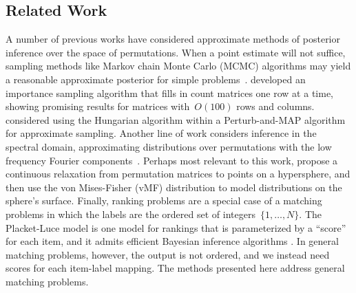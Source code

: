\documentclass[twoside]{article}
\begin{document}
\subsection{Related Work}
A number of previous works have considered approximate methods of
posterior inference over the space of permutations.  When a point
estimate will not suffice, sampling methods like Markov chain Monte
Carlo (MCMC) algorithms may yield a reasonable approximate posterior
for simple problems~\citep{diaconis1988group}.
\citet{harrison2013importance} developed an importance sampling
algorithm that fills in count matrices one row at a time, showing
promising results for matrices with~$O(100)$ rows and
columns. \citet{li2013efficient} considered using the Hungarian
algorithm within a Perturb-and-MAP algorithm for approximate sampling.
Another line of work considers inference in the spectral domain,
approximating distributions over permutations with the low frequency
Fourier components~\citep{kondor2007multi, huang2009fourier}.  Perhaps
most relevant to this work, \citet{plis2011directional} propose a
continuous relaxation from permutation matrices to points on a
hypersphere, and then use the von Mises-Fisher (vMF) distribution to
model distributions on the sphere's surface. Finally,
ranking problems are a special case of a matching
problems in which the labels are the ordered set of
integers~$\{1, \ldots, N\}$.  The Placket-Luce
model is one model for rankings that is parameterized by a ``score''
for each item, and it admits efficient Bayesian inference algorithms
\citep{Guiver2009bayesian}.  
In general matching problems, however, the output is not ordered, and
we instead need scores for each item-label mapping. The methods presented
here address general matching problems.

\end{document}
